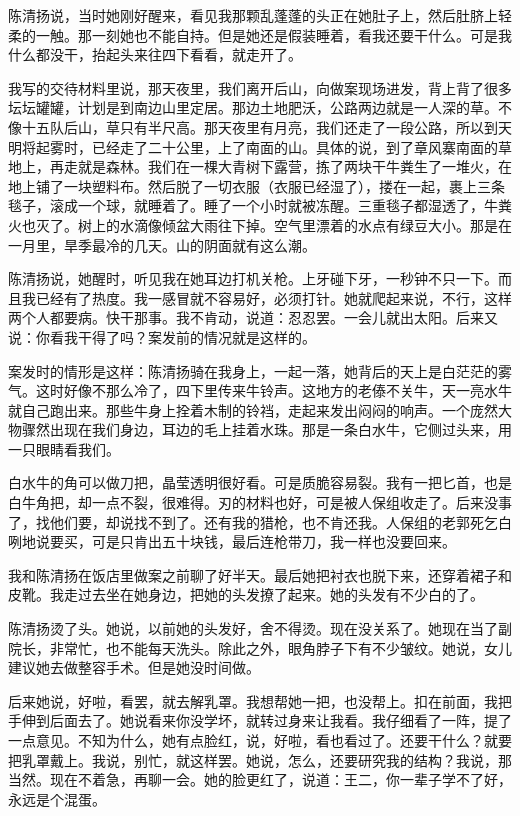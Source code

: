  陈清扬说，当时她刚好醒来，看见我那颗乱蓬蓬的头正在她肚子上，然后肚脐上轻柔的一触。那一刻她也不能自持。但是她还是假装睡着，看我还要干什么。可是我什么都没干，抬起头来往四下看看，就走开了。 
 
 我写的交待材料里说，那天夜里，我们离开后山，向做案现场进发，背上背了很多坛坛罐罐，计划是到南边山里定居。那边土地肥沃，公路两边就是一人深的草。不像十五队后山，草只有半尺高。那天夜里有月亮，我们还走了一段公路，所以到天明将起雾时，已经走了二十公里，上了南面的山。具体的说，到了章风寨南面的草地上，再走就是森林。我们在一棵大青树下露营，拣了两块干牛粪生了一堆火，在地上铺了一块塑料布。然后脱了一切衣服（衣服已经湿了），搂在一起，裹上三条毯子，滚成一个球，就睡着了。睡了一个小时就被冻醒。三重毯子都湿透了，牛粪火也灭了。树上的水滴像倾盆大雨往下掉。空气里漂着的水点有绿豆大小。那是在一月里，旱季最冷的几天。山的阴面就有这么潮。 
 
 陈清扬说，她醒时，听见我在她耳边打机关枪。上牙碰下牙，一秒钟不只一下。而且我已经有了热度。我一感冒就不容易好，必须打针。她就爬起来说，不行，这样两个人都要病。快干那事。我不肯动，说道：忍忍罢。一会儿就出太阳。后来又说：你看我干得了吗？案发前的情况就是这样的。 
 
 案发时的情形是这样：陈清扬骑在我身上，一起一落，她背后的天上是白茫茫的雾气。这时好像不那么冷了，四下里传来牛铃声。这地方的老傣不关牛，天一亮水牛就自己跑出来。那些牛身上拴着木制的铃裆，走起来发出闷闷的响声。一个庞然大物骤然出现在我们身边，耳边的毛上挂着水珠。那是一条白水牛，它侧过头来，用一只眼睛看我们。 
 
 白水牛的角可以做刀把，晶莹透明很好看。可是质脆容易裂。我有一把匕首，也是白牛角把，却一点不裂，很难得。刃的材料也好，可是被人保组收走了。后来没事了，找他们要，却说找不到了。还有我的猎枪，也不肯还我。人保组的老郭死乞白咧地说要买，可是只肯出五十块钱，最后连枪带刀，我一样也没要回来。 
 
 我和陈清扬在饭店里做案之前聊了好半天。最后她把衬衣也脱下来，还穿着裙子和皮靴。我走过去坐在她身边，把她的头发撩了起来。她的头发有不少白的了。 
 
 陈清扬烫了头。她说，以前她的头发好，舍不得烫。现在没关系了。她现在当了副院长，非常忙，也不能每天洗头。除此之外，眼角脖子下有不少皱纹。她说，女儿建议她去做整容手术。但是她没时间做。 
 
 后来她说，好啦，看罢，就去解乳罩。我想帮她一把，也没帮上。扣在前面，我把手伸到后面去了。她说看来你没学坏，就转过身来让我看。我仔细看了一阵，提了一点意见。不知为什么，她有点脸红，说，好啦，看也看过了。还要干什么？就要把乳罩戴上。我说，别忙，就这样罢。她说，怎么，还要研究我的结构？我说，那当然。现在不着急，再聊一会。她的脸更红了，说道：王二，你一辈子学不了好，永远是个混蛋。 
 
